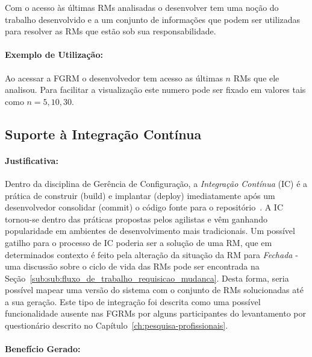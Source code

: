 Com o acesso às últimas RMs analisadas o desenvolver tem uma noção do trabalho
desenvolvido e a um conjunto de informações que podem ser utilizadas para
resolver as RMs que estão sob sua responsabilidade.

\paragraph{Exemplo de Utilização:}
\label{par:exemplo_de_utilização_s04}

Ao acessar a FGRM o desenvolvedor tem acesso as últimas $n$ RMs que ele
analisou. Para facilitar a visualização este numero pode ser fixado em valores
tais como $n = {5, 10, 30}$.

\subsection{Suporte à Integração Contínua}
\label{sub:suporte_integracao_continua}


\paragraph{Justificativa:}
\label{par:justificativa_s05}

Dentro da disciplina de Gerência de Configuração, a \textit{Integração Contínua}
(IC) é a prática de construir (build) e implantar (deploy) imediatamente após um
desenvolvedor consolidar (commit) o código fonte para o
repositório~\cite{aiello2010configuration}. A IC tornou-se dentro das práticas
propostas pelos agilistas e vêm ganhando popularidade em ambientes de
desenvolvimento mais tradicionais. Um possível gatilho para o processo de IC
poderia ser a solução de uma RM, que em determinados contexto é feito pela
alteração da situação da RM para \textit{Fechada} \@-\@ uma discussão sobre o
ciclo de vida das RMs pode ser encontrada na
Seção~\ref{sub:sub:fluxo_de_trabalho_requisicao_mudanca}. Desta forma, seria
possível mapear uma versão do sistema com o conjunto de RMs solucionadas até a
sua geração. Este tipo de integração foi descrita como uma possível
funcionalidade ausente nas FGRMs por alguns participantes do levantamento por
questionário descrito no Capítulo~\ref{ch:pesquisa-profissionais}.

\paragraph{Benefício Gerado:}
\label{par:papéis_afetados_s05}

